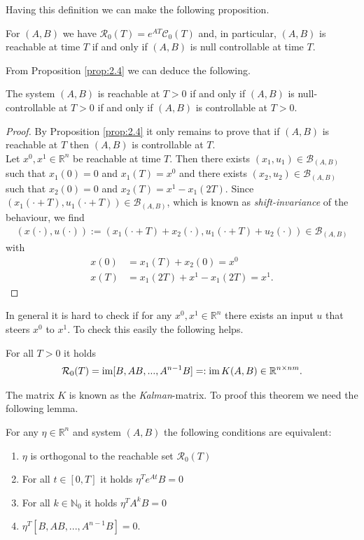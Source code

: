 Having this definition we can make the following proposition.
\begin{myprop}\label{prop:2.4}
	For $(A,B)$ we have $\mathcal{R}_0(T) = e^{AT}\mathcal{C}_0(T)$ and, in particular, $(A,B)$ is reachable at time $T$ if and only if $(A,B)$ is null controllable at time $T$.
\end{myprop}
\noindent From Proposition \ref{prop:2.4} we can deduce the following.
\begin{myprop}
	The system $(A,B)$ is reachable at $T>0$ if and only if $(A,B)$ is null-controllable at $T>0$ if and only if $(A,B)$ is controllable at $T>0$.
\end{myprop}
\begin{proof}
	By Proposition \ref{prop:2.4} it only remains to prove that if $(A,B)$ is reachable at $T$ then $(A,B)$ is controllable at $T$.\\Let $x^0,x^1 \in\mathbb{R}^n$ be reachable at time $T$. Then there exists $(x_1,u_1) \in \mathcal{B}_{(A,B)}$ such that $x_1(0)=0$ and $x_1(T)=x^0$ and there exists $(x_2,u_2)\in\mathcal{B}_{(A,B)}$ such that $x_2(0) = 0$ and $x_2(T) = x^1-x_1(2T)$. Since $(x_1(\cdot + T), u_1(\cdot+T)  )\in\mathcal{B}_{(A,B)}$, which is known as \emph{shift-invariance} of the behaviour, we find
	\begin{align*}
		(x(\cdot),u(\cdot)) := (x_1(\cdot+T)+x_2(\cdot), u_1(\cdot+T) +u_2(\cdot)  ) \in \mathcal{B}_{(A,B)}
	\end{align*}
	with
	\begin{align*}
		x(0) &= x_1(T) + x_2(0) = x^0\\
		x(T) &= x_1(2T) + x^1-x_1(2T) = x^1.
	\end{align*}
\end{proof}
In general it is hard to check if for any $x^0,x^1\in\mathbb{R}^n$ there exists an input $u$ that steers $x^0$ to $x^1$. To check this easily the following helps.
\begin{mythm}\label{thm:2.7}
	For all $T>0$ it holds
	\begin{align*}
		\mathcal{R}_0(T) = \operatorname{im}[B,AB,...,A^{n-1}B]   =: \operatorname{im} K(A,B) \in \mathbb{R}^{n \times nm}.
	\end{align*}
\end{mythm}
The matrix $K$ is known as the \emph{Kalman}-matrix. To proof this theorem we need the following lemma.
\begin{mylem}\label{lem:2.8}
	For any $\eta\in\mathbb{R}^n$ and system $(A,B)$ the following conditions are equivalent:
	\begin{enumerate}
		\item \label{1} $\eta$ is orthogonal to the reachable set $\mathcal{R}_0(T)$
		\item \label{2} For all $t\in [0,T]$ it holds $\eta^Te^{At}B=0$
		\item \label{3} For all $k \in \mathbb{N}_0$ it holds $\eta^TA^kB=0$
		\item \label{4} $\eta^T[B,AB,...,A^{n-1}B] = 0$.
		\end{enumerate}
\end{mylem}
